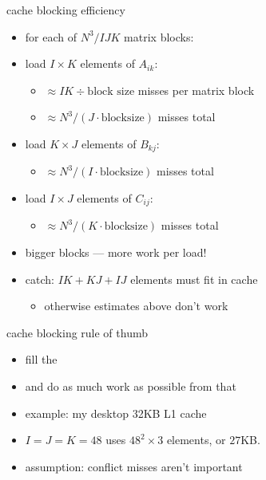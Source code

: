\begin{frame}{cache blocking efficiency}
\begin{itemize}
\item for each of $N^3/IJK$ matrix blocks:
\item load $I\times K$ elements of $A_{ik}$: 
    \begin{itemize}
        \item $\approx IK\div \text{block size}$ misses per matrix block
        \item $\approx N^3/(J\cdot\text{blocksize})$ misses total
    \end{itemize}
\item load $K\times J$ elements of $B_{kj}$: 
    \begin{itemize}
        \item $\approx N^3/(I\cdot\text{blocksize})$ misses total
    \end{itemize}
\item load $I\times J$ elements of $C_{ij}$:
    \begin{itemize}
        \item $\approx N^3/(K\cdot\text{blocksize})$ misses total
    \end{itemize}
\item bigger blocks --- more work per load!
\item catch: $IK+KJ+IJ$ elements must fit in cache
    \begin{itemize}
    \item otherwise estimates above don't work
    \end{itemize}
\end{itemize}
\end{frame}

\begin{frame}{cache blocking rule of thumb}
\begin{itemize}
\item fill the 
\item and do as much work as possible from that
\item example: my desktop 32KB L1 cache
\item $I=J=K=48$ uses $48^2\times 3$ elements, or $27$KB.
\item assumption: conflict misses aren't important
\end{itemize}
\end{frame}


